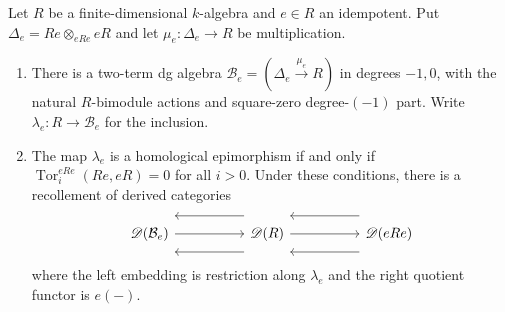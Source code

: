 \documentclass[11pt]{article}
\begin{document}
\begin{Prop}\label{dg:two-term}
Let $R$ be a finite-dimensional $k$-algebra and $e\in R$ an idempotent.
Put $\Delta_e=Re\otimes_{eRe}eR$ and let $\mu_e:\Delta_e\to R$ be
multiplication.
\begin{enumerate}
\item There is a two-term dg algebra
$\mathcal B_e=(\Delta_e\xrightarrow{\mu_e}R)$ in degrees $-1,0$,
with the natural $R$-bimodule actions and square-zero degree-$(-1)$ part.
Write $\lambda_e:R\to\mathcal B_e$ for the inclusion.
\item The map $\lambda_e$ is a homological
epimorphism if and only if
$\operatorname{Tor}^{eRe}_i(Re,eR)=0$ for all $i>0$.
Under these conditions, there is a recollement of derived categories
\[
\begin{tikzcd}[column sep=5em]
 \mathscr D(\mathcal B_e) \arrow[r]
 & \mathscr D(R)
   \arrow[l, shift right=3ex]
   \arrow[l, shift left=3ex]
   \arrow[r]
 & \mathscr D(eRe)
   \arrow[l, shift right=3ex]
   \arrow[l, shift left=3ex]
\end{tikzcd}
\]
where the left embedding is restriction along $\lambda_e$ and
the right quotient functor is $e(-)$.
\end{enumerate}
\end{Prop}
\end{document}
